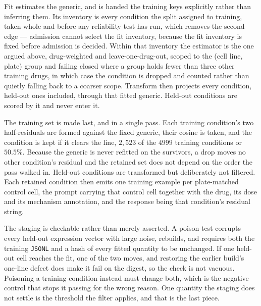 Fit estimates the generic, and is handed the training keys explicitly rather than
inferring them. Its inventory is every condition the split assigned to training,
taken whole and before any reliability test has run, which removes the second edge
--- admission cannot select the fit inventory, because the fit inventory is fixed
before admission is decided. Within that inventory the estimator is the one argued
above, drug-weighted and leave-one-drug-out, scoped to the (cell line, plate) group
and failing closed where a group holds fewer than three other training drugs, in
which case the condition is dropped and counted rather than quietly falling back to
a coarser scope. Transform then projects every condition, held-out ones included,
through that fitted generic. Held-out conditions are scored by it and never enter
it.

The training set is made last, and in a single pass. Each training condition's two
half-residuals are formed against the fixed generic, their cosine is taken, and the
condition is kept if it clears the line, $2{,}523$ of the $\num{4999}$ training
conditions or $50.5\%$. Because the generic is never refitted on the survivors, a
drop moves no other condition's residual and the retained set does not depend on the
order the pass walked in. Held-out conditions are transformed but deliberately not
filtered. Each retained condition then emits one training example per plate-matched
control cell, the prompt carrying that control cell together with the drug, its dose
and its mechanism annotation, and the response being that condition's residual
string.

The staging is checkable rather than merely asserted. A poison test corrupts every
held-out expression vector with large noise, rebuilds, and requires both the
training \texttt{JSONL} and a hash of every fitted quantity to be
unchanged. If one
held-out cell reaches the fit, one of the two moves, and restoring the earlier
build's one-line defect does make it fail on the digest, so the check is not
vacuous. Poisoning a training condition instead must change both, which is the
negative control that stops it passing for the wrong reason. One quantity the
staging does not settle is the threshold the filter applies, and that is the last
piece.


